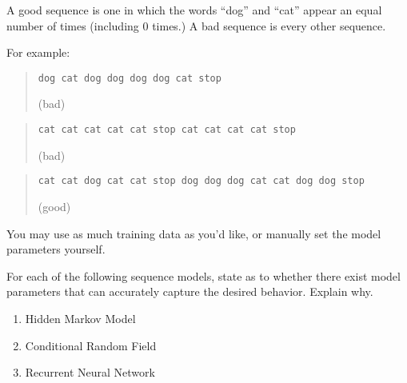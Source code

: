\documentclass[11pt]{article}
\begin{document}
A {\sc good} sequence is one in which the words ``dog'' and ``cat'' appear an equal number of times (including 0 times.) A {\sc bad} sequence is every other sequence.

For example:
\begin{quote}
\begin{verbatim}
dog cat dog dog dog dog cat stop
\end{verbatim}
 ({\sc bad})
\end{quote}

\begin{quote}
\begin{verbatim}
cat cat cat cat cat stop cat cat cat cat stop
\end{verbatim}
 ({\sc bad})
\end{quote}

\begin{quote}
\begin{verbatim}
cat cat dog cat cat stop dog dog dog cat cat dog dog stop
\end{verbatim}
 ({\sc good})
\end{quote}

You may use as much training data as you'd like, or manually set the model parameters yourself.

For each of the following sequence models, state as to whether there exist model parameters that can accurately capture the desired behavior. Explain why.

\begin{enumerate}[label=(\alph*)]
\item Hidden Markov Model

\begin{answertext}{8 cm}{}

\end{answertext}
\item Conditional Random Field

\begin{answertext}{8 cm}{}

\end{answertext}
\item Recurrent Neural Network

\begin{answertext}{8 cm}{}

\end{answertext}
\end{enumerate}
\end{document}
